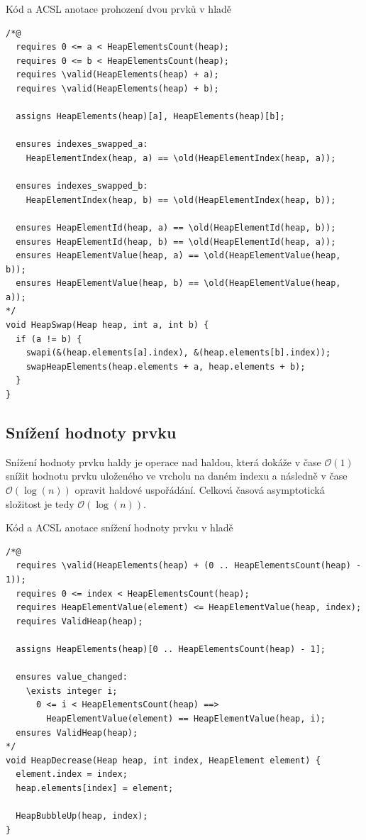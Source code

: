 \begin{listing}[H]
	\caption{Kód a ACSL anotace prohození dvou prvků v hladě}
	\label{code:HeapSwap}
	\begin{verbatim}
/*@
  requires 0 <= a < HeapElementsCount(heap);
  requires 0 <= b < HeapElementsCount(heap);
  requires \valid(HeapElements(heap) + a);
  requires \valid(HeapElements(heap) + b);

  assigns HeapElements(heap)[a], HeapElements(heap)[b];

  ensures indexes_swapped_a:
    HeapElementIndex(heap, a) == \old(HeapElementIndex(heap, a));

  ensures indexes_swapped_b:
    HeapElementIndex(heap, b) == \old(HeapElementIndex(heap, b));

  ensures HeapElementId(heap, a) == \old(HeapElementId(heap, b));
  ensures HeapElementId(heap, b) == \old(HeapElementId(heap, a));
  ensures HeapElementValue(heap, a) == \old(HeapElementValue(heap, b));
  ensures HeapElementValue(heap, b) == \old(HeapElementValue(heap, a));
*/
void HeapSwap(Heap heap, int a, int b) {
  if (a != b) {
    swapi(&(heap.elements[a].index), &(heap.elements[b].index));
    swapHeapElements(heap.elements + a, heap.elements + b);
  }
}
	\end{verbatim}
\end{listing}

\subsection{Snížení hodnoty prvku}
\label{subsec:HeapDecrease}

Snížení hodnoty prvku haldy je operace nad haldou, která dokáže v čase $\mathcal{O}(1)$ snížit hodnotu prvku uloženého ve vrcholu na daném indexu a následně v čase $\mathcal{O}(\log(n))$ opravit haldové uspořádání. Celková časová asymptotická složitost je tedy $\mathcal{O}(\log(n))$.

\begin{listing}[H]
	\caption{Kód a ACSL anotace snížení hodnoty prvku v hladě}
	\label{code:HeapDecrease}
	\begin{verbatim}
/*@
  requires \valid(HeapElements(heap) + (0 .. HeapElementsCount(heap) - 1));
  requires 0 <= index < HeapElementsCount(heap);
  requires HeapElementValue(element) <= HeapElementValue(heap, index);
  requires ValidHeap(heap);

  assigns HeapElements(heap)[0 .. HeapElementsCount(heap) - 1];

  ensures value_changed:
    \exists integer i;
      0 <= i < HeapElementsCount(heap) ==>
        HeapElementValue(element) == HeapElementValue(heap, i);
  ensures ValidHeap(heap);
*/
void HeapDecrease(Heap heap, int index, HeapElement element) {
  element.index = index;
  heap.elements[index] = element;

  HeapBubbleUp(heap, index);
}
	\end{verbatim}
\end{listing}

